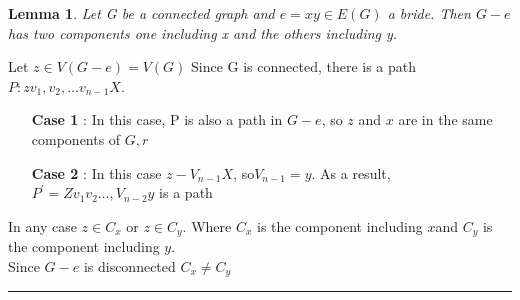 \documentclass{article}
\newtheorem{lemma}[theorem]{Lemma}
\newenvironment{proof}{{\bf Proof:}}{\hfill\rule{2mm}{2mm}}
\begin{document}
\begin{lemma}
Let G be a connected graph and \(e = xy \in E(G) \) a bride. Then \(G - e\) has two components one including x and the others including y.
\end{lemma}

\begin{proof}
Let \(z \in V(G-e) = V(G)\)
Since G is connected, there is a path \(P : z v_1, v_2, \ldots v_{n-1} X\).
\begin{itemize}
\item [\textbf{Case 1} :] In this case, P is also a path in \(G - e\), so \(z\) and \(x\) are in the same components of \(G, r\)
\item [\textbf{Case 2} :] In this case \(z - V_{n-1} X\), so\(V_{n-1} = y \). As a result, \(P^\prime = Z v_1 v_2 \ldots, V_{n-2} y\) is a path 
\end{itemize}
In any case \(z \in C_x\) or \(z \in C_y\). Where \(C_x\) is the component including \(x\)and \(C_y\) is the component including \(y\). \\
Since \(G-e\) is disconnected \(C_x \neq C_y\) 
\end{proof}
\end{document}
